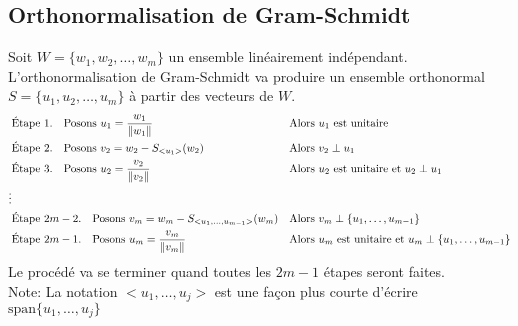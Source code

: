 \subsection{Orthonormalisation de Gram-Schmidt}
Soit $W = \{w_1, w_2, \dots, w_m\}$ un ensemble linéairement indépendant. L'orthonormalisation 
de Gram-Schmidt va produire un ensemble orthonormal $S = \{u_1, u_2, \dots, u_m\}$ à partir
des vecteurs de $W$. 
\begin{align*}
      &\text{Étape} \ 1. \quad \text{Posons} \ u_1 = \frac{w_1}{\left\lVert w_1\right\rVert}& &\text{Alors} \ u_1 \ \text{est unitaire} \\
      &\text{Étape} \ 2. \quad \text{Posons} \ v_2 = w_2 - S_{<u_1>}(w_2)& &\text{Alors} \ v_2 \perp u_1 \\
      &\text{Étape} \ 3. \quad \text{Posons} \ u_2 = \frac{v_2}{\left\lVert v_2\right\rVert}& &\text{Alors} \ u_2 \ \text{est unitaire et} \ u_2 \perp u_1 \\
      \vdots \\
      &\text{Étape} \ 2m - 2. \quad \text{Posons} \ v_{m} = w_{m} - S_{<u_1, \dots, u_{m - 1}>}(w_{m})& &\text{Alors} \ v_{m} \perp \{u_1, \dots, u_{m - 1}\} \\
      &\text{Étape} \ 2m - 1. \quad \text{Posons} \ u_{m} = \frac{v_{m}}{\left\lVert v_{m}\right\rVert} & &\text{Alors} \ u_{m} \ \text{est unitaire et} \ u_{m} \perp \{u_1, \dots, u_{m - 1}\}
\end{align*}
Le procédé va se terminer quand toutes les $2m - 1$ étapes seront faites. \\
Note: La notation $<u_1, \dots, u_j>$ est une façon plus courte d'écrire $\text{span}\{u_1, \dots, u_j\}$